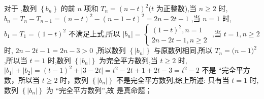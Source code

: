 \begin{enumerate}
    \begin{jieda}
        对于  ,数列 $\left\{  {b}_{n}\right\}$ 的前 $n$ 项和 ${T}_{n} = {\left( n - t\right) }^{2}(t$ 为正整数),当 $n \geq  2$ 时, ${b}_{n} = {T}_{n} - {T}_{n - 1} = {\left( n - t\right) }^{2} - {\left( n - 1 - t\right) }^{2} =  {2n} - {2t} - 1$ ,当 $n = 1$ 时, ${b}_{1} = {T}_{1} = {\left( 1 - t\right) }^{2}$ 不满足上式,所以 $\left| {b}_{n}\right|  = \left\{  {\begin{array}{l} {\left( 1 - t\right) }^{2},n = 1 \\  {2n} - {2t} - 1,n \geq  2 \end{array}\text{ ,当 }t = 1,n \geq  2}\right.$ 时, ${2n} - {2t} - 1 =  {2n} - 3 > 0$ ,所以数列 $\left\{  \left| {b}_{n}\right| \right\}$ 与原数列相同,所以 ${T}_{n} = (n -  1{)}^{2}$ ,所以当 $t = 1$ 时,数列 $\left\{  \left| {b}_{n}\right| \right\}$ 为完全平方数列,当 $t \geq  2$ 时, $\left| {b}_{1}\right|  + \left| {b}_{2}\right|  = {\left( t - 1\right) }^{2} + \left| {3 - {2t}}\right|  = {t}^{2} - {2t} + 1 + {2t} - 3 =  {t}^{2} - 2$ 不是 “完全平方数，所以当 $t \geq  2$ 时，数列 $\left\{  \left| {b}_{n}\right| \right\}$ 不是完全平方数列,综上所述: 只有当 $t = 1$ 时,数列 $\left\{  \left| {b}_{n}\right| \right\}$ 为 “完全平方数列”,故  是真命题；
        

\end{jieda}
\end{enumerate}
